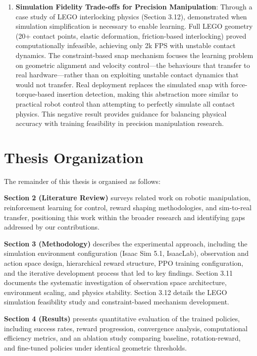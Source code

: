 \documentclass[12pt,a4paper,oneside]{report}
\begin{document}
\begin{enumerate}
    \item \textbf{Simulation Fidelity Trade-offs for Precision Manipulation}: Through a case study of LEGO interlocking physics (Section 3.12), demonstrated when simulation simplification is necessary to enable learning. Full LEGO geometry (20+ contact points, elastic deformation, friction-based interlocking) proved computationally infeasible, achieving only 2k FPS with unstable contact dynamics. The constraint-based snap mechanism focuses the learning problem on geometric alignment and velocity control---the behaviours that transfer to real hardware---rather than on exploiting unstable contact dynamics that would not transfer. Real deployment replaces the simulated snap with force-torque-based insertion detection, making this abstraction more similar to practical robot control than attempting to perfectly simulate all contact physics. This negative result provides guidance for balancing physical accuracy with training feasibility in precision manipulation research.
\end{enumerate}

\section{Thesis Organization}

The remainder of this thesis is organised as follows:

\textbf{Section 2 (Literature Review)} surveys related work on robotic manipulation, reinforcement learning for control, reward shaping methodologies, and sim-to-real transfer, positioning this work within the broader research and identifying gaps addressed by our contributions.

\textbf{Section 3 (Methodology)} describes the experimental approach, including the simulation environment configuration (Isaac Sim 5.1, IsaacLab), observation and action space design, hierarchical reward structure, PPO training configuration, and the iterative development process that led to key findings. Section 3.11 documents the systematic investigation of observation space architecture, environment scaling, and physics stability. Section 3.12 details the LEGO simulation feasibility study and constraint-based mechanism development.

\textbf{Section 4 (Results)} presents quantitative evaluation of the trained policies, including success rates, reward progression, convergence analysis, computational efficiency metrics, and an ablation study comparing baseline, rotation-reward, and fine-tuned policies under identical geometric thresholds.
\end{document}
